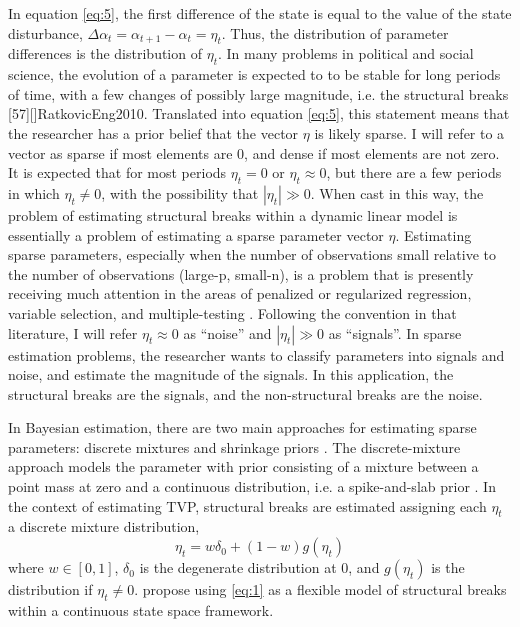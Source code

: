 \documentclass{article}
\begin{document}
In equation \eqref{eq:5}, the first difference of the state is equal to the value of the state disturbance, $\Delta \alpha_{t} = \alpha_{t+1} - \alpha_{t} = \eta_{t}$.
Thus, the distribution of parameter differences is the distribution of $\eta_{t}$.
In many problems in political and social science, the evolution of a parameter is expected to to be stable for long periods of time, with a few changes of possibly large magnitude, i.e. the structural breaks \parencite{Pierson2004}[57][]{RatkovicEng2010}.
Translated into equation \eqref{eq:5}, this statement means that the researcher has a prior belief that the vector $\eta$ is likely sparse.
I will refer to a vector as sparse if most elements are 0, and dense if most elements are not zero.
It is expected that for most periods $\eta_{t} = 0$ or $\eta_{t} \approx 0$, but there are a few periods in which $\eta_{t} \neq 0$, with the possibility that $|\eta_{t}| \gg 0$.
When cast in this way, the problem of estimating structural breaks within a dynamic linear model is essentially a problem of estimating a sparse parameter vector $\eta$.
Estimating sparse parameters, especially when the number of observations small relative to the number of observations (large-p, small-n), is a problem that is presently receiving much attention in the areas of penalized or regularized regression, variable selection, and multiple-testing \parencite{CarvalhoPolsonScott2010}.
Following the convention in that literature, I will refer $\eta_{t} \approx 0$ as ``noise'' and $|\eta_{t}| \gg 0$ as ``signals''.
In sparse estimation problems, the researcher wants to classify parameters into signals and noise, and estimate the magnitude of the signals.
In this application, the structural breaks are the signals, and the non-structural breaks are the noise.

In Bayesian estimation, there are two main approaches for estimating sparse parameters: discrete mixtures and shrinkage priors \parencite[73]{CarvalhoPolsonScott2009}.
The discrete-mixture approach models the parameter with prior consisting of a mixture between a point mass at zero and a continuous distribution, i.e. a spike-and-slab prior \parencite{GeorgeMcCulloch1993}.
In the context of estimating TVP, structural breaks are estimated assigning each $\eta_{t}$ a discrete mixture distribution,
\begin{equation}
  \label{eq:1}
  \eta_{t} = w \delta_{0} +  (1 - w) g(\eta_{t})
\end{equation}
where $w \in [0, 1]$, $\delta_{0}$ is the degenerate distribution at 0, and $g(\eta_{t})$ is the distribution if $\eta_{t} \neq 0$.
\textcite{GiordaniKohn2008} propose using \eqref{eq:1} as a flexible model of structural breaks within a continuous state space framework.
\end{document}
